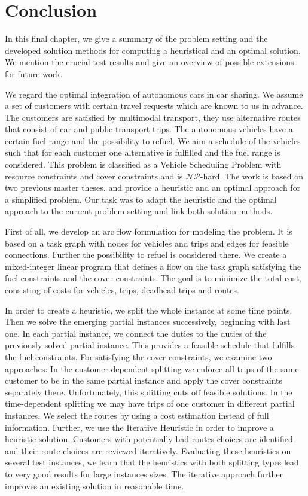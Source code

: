 \chapter{Conclusion}
\label{ch:conclusion}

In this final chapter, we give a summary of the problem setting and the developed solution methods for computing a heuristical and an optimal solution. We mention the crucial test results and give an overview of possible extensions for future work.

We regard the optimal integration of autonomous cars in car sharing. We assume a set of customers with certain travel requests which are known to us in advance. The customers are satisfied by multimodal transport, \ie they use alternative routes that consist of car and public transport trips. The autonomous vehicles have a certain fuel range and the possibility to refuel. We aim a schedule of the vehicles such that for each customer one alternative is fulfilled and the fuel range is considered. This problem is classified as a Vehicle Scheduling Problem with resource constraints and cover constraints and is $\mathcal{NP}$-hard. The work is based on two previous master theses. \cite{Knoll} and \cite{Kaiser} provide a heuristic and an optimal approach for a simplified problem. Our task was to adapt the heuristic and the optimal approach to the current problem setting and link both solution methods.

First of all, we develop an arc flow formulation for modeling the problem. It is based on a task graph with nodes for vehicles and trips and edges for feasible connections. Further the possibility to refuel is considered there. We create a mixed-integer linear program that defines a flow on the task graph satisfying the fuel constraints and the cover constraints. The goal is to minimize the total cost, consisting of costs for vehicles, trips, deadhead trips and routes.

In order to create a heuristic, we split the whole instance at some time points. Then we solve the emerging partial instances successively, beginning with last one. In each partial instance, we connect the duties to the duties of the previously solved partial instance. This provides a feasible schedule that fulfills the fuel constraints. For satisfying the cover constraints, we examine two approaches: In the customer-dependent splitting we enforce all trips of the same customer to be in the same partial instance and apply the cover constraints separately there. Unfortunately, this splitting cuts off feasible solutions. In the time-dependent splitting we may have trips of one customer in different partial instances. We select the routes by using a cost estimation instead of full information. Further, we use the Iterative Heuristic in order to improve a heuristic solution. Customers with potentially bad routes choices are identified and their route choices are reviewed iteratively. Evaluating these heuristics on several test instances, we learn that the heuristics with both splitting types lead to very good results for large instances sizes. The iterative approach further improves an existing solution in reasonable time.

